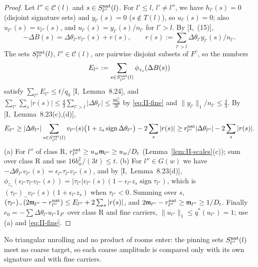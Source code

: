 \documentclass[10pt]{amsart}
\theoremstyle{definition}
\theoremstyle{remark}
\newcommand{\sgn}{\operatorname{sign}}
\begin{document}
\begin{proof}
Let $l''\in\mathcal C(l)$ and $s\in S^{\rm nat}_{l''}(l)$.  For $l'\le l$,
$l'\ne l''$, we have $h_{l'}(s)=0$ (disjoint signature sets) and
$y_{l'}(s)=0$ ($s\notin T(l)$), so $u_{l'}(s)=0$; also $u_{l''}(s)=
v_{l''}(s)$, and $u_{l'}(s)=y_{l'}(s)/n_{l'}$ for $l'>l$.  By
[I,~(15)],
\[
 -\Delta B(s)=\Delta\theta_{l''}v_{l''}(s)+r(s),\qquad r(s):=\sum_{l'>l}
 \Delta\theta_{l'}y_{l'}(s)/n_{l'} .
\]
The sets $S^{\rm nat}_{l''}(l)$, $l''\in\mathcal C(l)$, are pairwise disjoint
subsets of $F^c$, so the numbers
\[
 E_{l''}:=\sum_{s\in S^{\rm nat}_{l''}(l)}\phi_{z_s}(\Delta B(s))
\]
satisfy $\sum_{l''}E_{l''}\le t/q_0$ [I,~Lemma~8.24], and
$\sum_{l''}\sum_s|r(s)|\le\frac43\sum_{l'>l}|\Delta\theta_{l'}|\le
\frac{8b_w^2}{3t}$ by \eqref{eq:II-fine} and $\|y_{l'}\|_1/n_{l'}\le\frac43$.
By [I,~Lemma~8.23(c),(d)],
\[
 E_{l''}\ge|\Delta\theta_{l''}|\sum_{s\in S^{\rm nat}_{l''}(l)}v_{l''}(s)
 \big(1+z_s\sgn\Delta\theta_{l''}\big)-2\sum_s|r(s)|
 \ge r^{\rm nat}_{l''}|\Delta\theta_{l''}|-2\sum_s|r(s)| .
\]
(a) For $l''$ of class R, $r^{\rm nat}_{l''}\ge u_w\mathfrak m_{l''}\ge
u_w/D_{\rm r}$ (Lemma~\ref{lem:II-scales}(c)); sum over class R and use
$16b_w^2/(3t)\le t$.
(b) For $l''\in G(w)$ we have $-\Delta\theta_{l''}v_{l''}(s)=
\epsilon_{l''}\tau_{l''}v_{l''}(s)$, and by [I,~Lemma~8.23(d)],
$\phi_{z_s}(\epsilon_{l''}\tau_{l''}v_{l''}(s))=|\tau_{l''}|v_{l''}(s)
(1-\epsilon_{l''}z_s\sgn\tau_{l''})$, which is
$(\tau_{l''})_-v_{l''}(s)(1+\epsilon_{l''}z_s)$ when $\tau_{l''}<0$.  Summing
over $s$, $(\tau_{l''})_-(2\mathfrak m_{l''}-r^{\rm nat}_{l''})\le E_{l''}
+2\sum_s|r(s)|$, and $2\mathfrak m_{l''}-r^{\rm nat}_{l''}\ge\mathfrak
m_{l''}\ge1/D_{\rm r}$.  Finally $e_0=-\sum\Delta\theta_{l''}u_{l''}1_{F^c}$
over class R and fine carriers, $\|u_{l''}\|_1\le q^*(u_{l''})=1$; use (a)
and \eqref{eq:II-fine}.
\end{proof}

No triangular unrolling and no product of rooms enter: the pinning sets
$S^{\rm nat}_{l''}(l)$ meet no coarse target, so each coarse amplitude is
compared only with its own signature and with fine carriers.
\end{document}
